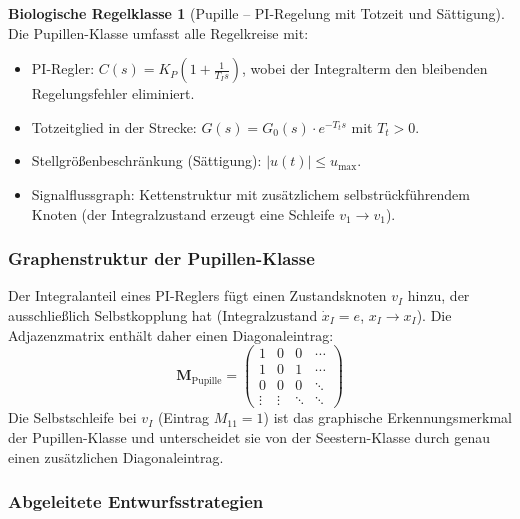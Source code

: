 \documentclass[a4paper,12pt]{article}
\theoremstyle{definition}
\newtheorem{klasse}{Biologische Regelklasse}
\begin{document}
\begin{klasse}[Pupille -- PI-Regelung mit Totzeit und Sättigung]
	\label{kl:pupille}
	Die Pupillen-Klasse umfasst alle Regelkreise mit:
	\begin{itemize}
		\item PI-Regler: $C(s) = K_P\left(1 + \frac{1}{T_I s}\right)$, wobei der
		Integralterm den bleibenden Regelungsfehler eliminiert.
		\item Totzeitglied in der Strecke: $G(s) = G_0(s) \cdot e^{-T_t s}$
		mit $T_t > 0$.
		\item Stellgrößenbeschränkung (Sättigung): $|u(t)| \leq u_{\max}$.
		\item Signalflussgraph: Kettenstruktur mit zusätzlichem selbstrückführendem
		Knoten (der Integralzustand erzeugt eine Schleife $v_1 \to v_1$).
	\end{itemize}
\end{klasse}

\subsubsection{Graphenstruktur der Pupillen-Klasse}

Der Integralanteil eines PI-Reglers fügt einen Zustandsknoten $v_I$ hinzu,
der ausschließlich Selbstkopplung hat (Integralzustand $\dot{x}_I = e$,
$x_I \to x_I$). Die Adjazenzmatrix enthält daher einen Diagonaleintrag:
\[
\mathbf{M}_{\text{Pupille}} =
\begin{pmatrix}
	1      & 0      & 0      & \cdots \\
	1      & 0      & 1      & \cdots \\
	0      & 0      & 0      & \ddots \\
	\vdots & \vdots & \ddots & \ddots
\end{pmatrix}
\]
Die Selbstschleife bei $v_I$ (Eintrag $M_{11} = 1$) ist das graphische
Erkennungsmerkmal der Pupillen-Klasse und unterscheidet sie von der
Seestern-Klasse durch genau einen zusätzlichen Diagonaleintrag.

\subsubsection{Abgeleitete Entwurfsstrategien}
\end{document}
